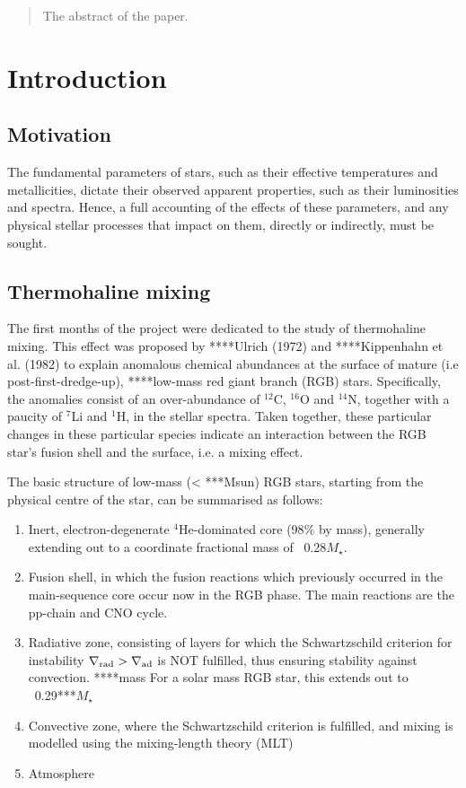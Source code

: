 \documentclass[usenatbib]{mnras}
\begin{document}
\begin{abstract}
The abstract of the paper.
\end{abstract}

\section{Introduction}
\subsection{Motivation}
The fundamental parameters of stars, such as their effective temperatures and metallicities, dictate their observed apparent properties, such as their luminosities and spectra. Hence, a full accounting of the effects of these parameters, and any physical stellar processes that impact on them, directly or indirectly, must be sought.

\subsection{Thermohaline mixing}
The first months of the project were dedicated to the study of thermohaline mixing. This effect was proposed by ****Ulrich (1972) and ****Kippenhahn et al. (1982) to explain anomalous chemical abundances at the surface of mature (i.e post-first-dredge-up), ****low-mass red giant branch (RGB) stars. Specifically, the anomalies consist of an over-abundance of $^{12}$C, $^{16}$O and $^{14}$N, together with a paucity of $^{7}$Li and $^{1}$H, in the stellar spectra. Taken together, these particular changes in these particular species indicate an interaction between the RGB star's fusion shell and the surface, i.e. a mixing effect.

The basic structure of low-mass (< ***Msun) RGB stars, starting from the physical centre of the star, can be summarised as follows:

\begin{enumerate}
\item Inert, electron-degenerate $^{4}$He-dominated core (98$\%$ by mass), generally extending out to a coordinate fractional mass of ~0.28$M_{\star}$.
\item Fusion shell, in which the fusion reactions which previously occurred in the main-sequence core occur now in the RGB phase. The main reactions are the pp-chain and CNO cycle.
\item Radiative zone, consisting of layers for which the Schwartzschild criterion for instability $\nabla _{\textnormal{rad}} > \nabla _{\textnormal{ad}}$ is NOT fulfilled, thus ensuring stability against convection. ****mass For a solar mass RGB star, this extends out to ~0.29***$M_{\star}$
\item Convective zone, where the Schwartzschild criterion is fulfilled, and mixing is modelled using the mixing-length theory (MLT)
\item Atmosphere
\end{enumerate} 
\end{document}
